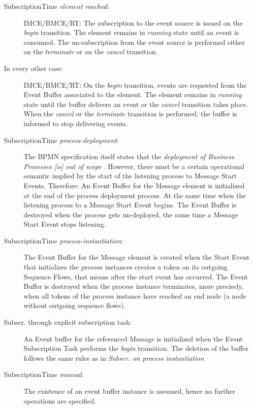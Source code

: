 \begin{description}
	\item[SubscriptionTime \textit{element reached}:]
	IMCE/BMCE/RT: The subscription to the event source is issued on the \textit{begin} transition. The element remains in \textit{running} state until an event is consumed. The un-subscription from the event source is performed either on the \textit{terminate} or on the \textit{cancel} transition.
	
	\item[In every other case:] 
	IMCE/BMCE/RT: On the \textit{begin} transition, events are requested from the Event Buffer associated to the element.
	The element remains in \textit{running} state until the buffer delivers an event or the \textit{cancel}	transition takes place.
	When the \textit{cancel} or the \textit{terminate} transition is performed, the buffer is informed to stop delivering events.
	
	\item[SubscriptionTime \textit{process-deployment}:]
	The BPMN specification itself states that the \textit{deployment of Business Processes [is] out of scope} \cite[p.\,22]{bpmnspec}.
	However, there must be a certain operational semantic implied by the start of the listening process to Message Start Events.
	Therefore: An Event Buffer for the Message element is initialized at the end of the process deployment process. At the same time when the listening process to a Message Start Event begins.
	The Event Buffer is destroyed when the process gets un-deployed, the same time a Message Start Event stops listening.
	
	\item[SubscriptionTime \textit{process-instantiation}:] 
	The Event Buffer for the Message element is created when the Start Event that initializes the process instances creates a token on its outgoing Sequence Flows, that means after the start event has occurred.
	The Event Buffer is destroyed when the process instance terminates, more precisely, when all tokens of the process instance have reached an end node (a node without outgoing sequence flows).
	
	\item[Subscr. through explicit subscription task:]
	An Event buffer for the referenced Message is initialized when the Event Subscription Task performs the \textit{begin} transition.
	The deletion of the buffer follows the same rules as in \textit{Subscr. on process instantiation}
	
	\item[SubscriptionTime \textit{manual}:]
	The existence of an event buffer instance is assumed, hence no further operations are specified.
\end{description}



